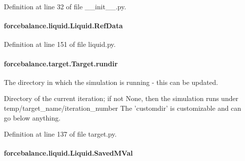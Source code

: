 Definition at line 32 of file \-\_\-\-\_\-init\-\_\-\-\_\-.\-py.

\hypertarget{classforcebalance_1_1liquid_1_1Liquid_a472f32bbaf18b8ead19b9156f305b8fc}{
\paragraph[{Ref\-Data}]{\setlength{\rightskip}{0pt plus 5cm}forcebalance.\-liquid.\-Liquid.\-Ref\-Data\hspace{0.3cm}{\ttfamily [inherited]}}}\label{classforcebalance_1_1liquid_1_1Liquid_a472f32bbaf18b8ead19b9156f305b8fc}


Definition at line 151 of file liquid.\-py.

\hypertarget{classforcebalance_1_1target_1_1Target_a6872de5b2d4273b82336ea5b0da29c9e}{
\paragraph[{rundir}]{\setlength{\rightskip}{0pt plus 5cm}forcebalance.\-target.\-Target.\-rundir\hspace{0.3cm}{\ttfamily [inherited]}}}\label{classforcebalance_1_1target_1_1Target_a6872de5b2d4273b82336ea5b0da29c9e}


The directory in which the simulation is running -\/ this can be updated. 

Directory of the current iteration; if not None, then the simulation runs under temp/target\-\_\-name/iteration\-\_\-number The 'customdir' is customizable and can go below anything.

Definition at line 137 of file target.\-py.

\hypertarget{classforcebalance_1_1liquid_1_1Liquid_a5b9df1bf79a641156429e292f47b6afd}{
\paragraph[{Saved\-M\-Val}]{\setlength{\rightskip}{0pt plus 5cm}forcebalance.\-liquid.\-Liquid.\-Saved\-M\-Val\hspace{0.3cm}{\ttfamily [inherited]}}}\label{classforcebalance_1_1liquid_1_1Liquid_a5b9df1bf79a641156429e292f47b6afd}


